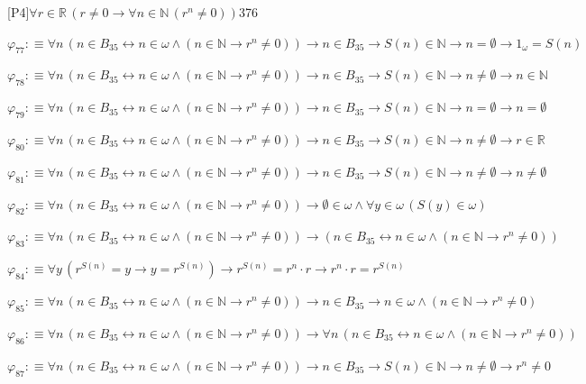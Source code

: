 \begin{fullproof}{[P4]}{$\forall r \in \mathbb{R}\,(r \neq 0 \to \forall n \in \mathbb{N}\,({{r}^{n}} \neq 0))$}{376}
\begin{abbrevlist}
\item $\varphi_{77} :\equiv \forall n\,(n \in B_{35} \leftrightarrow n \in \omega \land (n \in \mathbb{N} \to {{r}^{n}} \neq 0)) \to n \in B_{35} \to S(n) \in \mathbb{N} \to n = \emptyset \to 1_{\omega} = S(n)$
\item $\varphi_{78} :\equiv \forall n\,(n \in B_{35} \leftrightarrow n \in \omega \land (n \in \mathbb{N} \to {{r}^{n}} \neq 0)) \to n \in B_{35} \to S(n) \in \mathbb{N} \to n \neq \emptyset \to n \in \mathbb{N}$
\item $\varphi_{79} :\equiv \forall n\,(n \in B_{35} \leftrightarrow n \in \omega \land (n \in \mathbb{N} \to {{r}^{n}} \neq 0)) \to n \in B_{35} \to S(n) \in \mathbb{N} \to n = \emptyset \to n = \emptyset$
\item $\varphi_{80} :\equiv \forall n\,(n \in B_{35} \leftrightarrow n \in \omega \land (n \in \mathbb{N} \to {{r}^{n}} \neq 0)) \to n \in B_{35} \to S(n) \in \mathbb{N} \to n \neq \emptyset \to r \in \mathbb{R}$
\item $\varphi_{81} :\equiv \forall n\,(n \in B_{35} \leftrightarrow n \in \omega \land (n \in \mathbb{N} \to {{r}^{n}} \neq 0)) \to n \in B_{35} \to S(n) \in \mathbb{N} \to n \neq \emptyset \to n \neq \emptyset$
\item $\varphi_{82} :\equiv \forall n\,(n \in B_{35} \leftrightarrow n \in \omega \land (n \in \mathbb{N} \to {{r}^{n}} \neq 0)) \to \emptyset \in \omega \land \forall y \in \omega\,(S(y) \in \omega)$
\item $\varphi_{83} :\equiv \forall n\,(n \in B_{35} \leftrightarrow n \in \omega \land (n \in \mathbb{N} \to {{r}^{n}} \neq 0)) \to (n \in B_{35} \leftrightarrow n \in \omega \land (n \in \mathbb{N} \to {{r}^{n}} \neq 0))$
\item $\varphi_{84} :\equiv \forall y\,({{r}^{S(n)}} = y \to y = {{r}^{S(n)}}) \to {{r}^{S(n)}} = {{r}^{n}} \cdot r \to {{r}^{n}} \cdot r = {{r}^{S(n)}}$
\item $\varphi_{85} :\equiv \forall n\,(n \in B_{35} \leftrightarrow n \in \omega \land (n \in \mathbb{N} \to {{r}^{n}} \neq 0)) \to n \in B_{35} \to n \in \omega \land (n \in \mathbb{N} \to {{r}^{n}} \neq 0)$
\item $\varphi_{86} :\equiv \forall n\,(n \in B_{35} \leftrightarrow n \in \omega \land (n \in \mathbb{N} \to {{r}^{n}} \neq 0)) \to \forall n\,(n \in B_{35} \leftrightarrow n \in \omega \land (n \in \mathbb{N} \to {{r}^{n}} \neq 0))$
\item $\varphi_{87} :\equiv \forall n\,(n \in B_{35} \leftrightarrow n \in \omega \land (n \in \mathbb{N} \to {{r}^{n}} \neq 0)) \to n \in B_{35} \to S(n) \in \mathbb{N} \to n \neq \emptyset \to {{r}^{n}} \neq 0$

\end{abbrevlist}
\end{fullproof}
